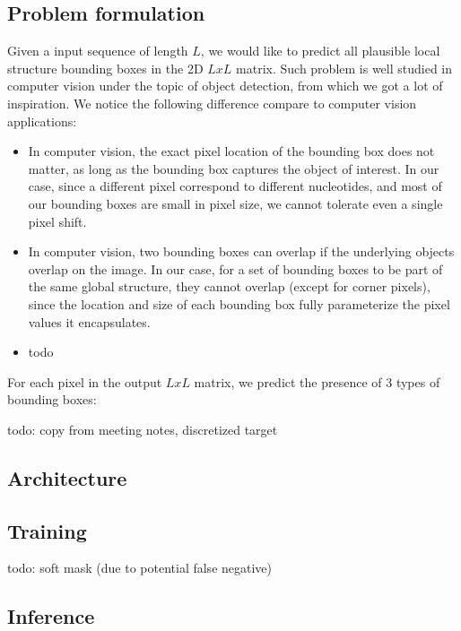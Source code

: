 \documentclass[12pt]{article}
\begin{document}
\subsection{Problem formulation}

Given a input sequence of length $L$,
we would like to predict all plausible local structure bounding boxes in the 2D $L x L$ matrix.
Such problem is well studied in computer vision under the topic of object detection,
from which we got a lot of inspiration.
We notice the following difference compare to computer vision applications:

\begin{itemize}
    \item In computer vision, the exact pixel location of the bounding box does not matter,
    as long as the bounding box captures the object of interest.
    In our case, since a different pixel correspond to different nucleotides,
    and most of our bounding boxes are small in pixel size, we cannot tolerate even a single pixel shift.

    \item In computer vision, two bounding boxes can overlap
    if the underlying objects overlap on the image. In our case, for a set of bounding boxes to
    be part of the same global structure, they cannot overlap (except for corner pixels),
    since the location and size of each bounding box fully parameterize the pixel values it encapsulates.

    \item todo
\end{itemize}


For each pixel in the output $L x L$ matrix, we predict the presence of $3$ types of bounding boxes:

todo: copy from meeting notes, discretized target

\subsection{Architecture}


\subsection{Training}

todo: soft mask (due to potential false negative)

\subsection{Inference} \label{sec:inference}
\end{document}
